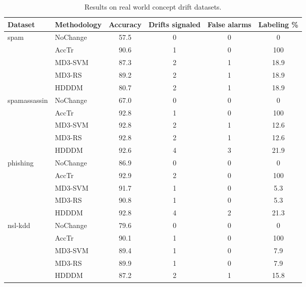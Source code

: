 \documentclass[authoryear,3p,times,twocolumn]{elsarticle}
\begin{document}
\begin{table}[t]
\centering
\caption{Description of real world concept drift datasets from cyber-security domain.}
\label{tbl:cdd_data}

\end{table}


\begin{table*}[t]
\centering
\caption{Results on real world concept drift datasets.}
\label{tbl:cdd_results}
\begin{tabular}{|l|l|c|c|c|c|}
\hline
Dataset & Methodology & Accuracy & Drifts signaled & False alarms & Labeling \% \\ \hline
\multirow{5}{*}{spam} & NoChange & 57.5 & 0 & 0 & 0 \\ \cline{2-6} 
 & AccTr & 90.6 & 1 & 0 & 100 \\ \cline{2-6} 
 & MD3-SVM & 87.3 & 2 & 1 & 18.9 \\ \cline{2-6} 
 & MD3-RS & 89.2 & 2 & 1 & 18.9 \\ \cline{2-6} 
 & HDDDM & 80.7 & 2 & 1 & 18.9 \\ \hline
\multicolumn{1}{|c|}{\multirow{5}{*}{spamassassin}} & NoChange & 67.0 & 0 & 0 & 0 \\ \cline{2-6} 
\multicolumn{1}{|c|}{} & AccTr & 92.8 & 1 & 0 & 100 \\ \cline{2-6} 
\multicolumn{1}{|c|}{} & MD3-SVM & 92.8 & 2 & 1 & 12.6 \\ \cline{2-6} 
\multicolumn{1}{|c|}{} & MD3-RS & 92.8 & 2 & 1 & 12.6 \\ \cline{2-6} 
\multicolumn{1}{|c|}{} & HDDDM & 92.6 & 4 & 3 & 21.9 \\ \hline
\multirow{5}{*}{phishing} & NoChange & 86.9 & 0 & 0 & 0 \\ \cline{2-6} 
 & AccTr & 92.9 & 2 & 0 & 100 \\ \cline{2-6} 
 & MD3-SVM & 91.7 & 1 & 0 & 5.3 \\ \cline{2-6} 
 & MD3-RS & 90.8 & 1 & 0 & 5.3 \\ \cline{2-6} 
 & HDDDM & 92.8 & 4 & 2 & 21.3 \\ \hline
\multirow{5}{*}{nsl-kdd} & NoChange & 79.6 & 0 & 0 & 0 \\ \cline{2-6} 
 & AccTr & 90.1 & 1 & 0 & 100 \\ \cline{2-6} 
 & MD3-SVM & 89.4 & 1 & 0 & 7.9 \\ \cline{2-6} 
 & MD3-RS & 89.9 & 1 & 0 & 7.9 \\ \cline{2-6} 
 & HDDDM & 87.2 & 2 & 1 & 15.8 \\ \hline
\end{tabular}
\end{table*}
\end{document}

